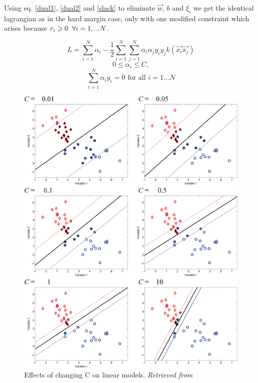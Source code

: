 \documentclass[final,3p,times,twocolumn]{elsarticle}
\begin{document}
Using eq. \ref{dual1}, \ref{dual2} and \ref{slack} to eliminate $\vec{w}$, $b$ and $\xi_{i}$ we get the identical lagrangian as in the hard margin case, only with one modified constraint which arises because $r_{i} \geqslant 0 \hspace{2mm} \forall i=1,...N$.

\begin{equation}
L = \sum_{i=1}^N\alpha_{i} - \frac{1}{2}\sum_{i=1}^N\sum_{j=1}^N\alpha_{i}\alpha_{j}y_{i}y_{j}k(\vec{x_{i}}\vec{x_{j}})
\end{equation}
\begin{equation*}
0 \leqslant \alpha_{i} \leqslant C, 
\end{equation*}
\begin{equation*}
\sum_{i=1}^N\alpha_{i}y_{i} = 0 \textrm{ for all }  i = 1...N
\end{equation*}

\begin{figure}
\includegraphics[scale=0.7]{Images/Changing_C.png} 
\caption{Effects of changing C on linear models. \textit{Retrieved from \cite{RBF2}}}
\label{changing_C}
\end{figure}
\end{document}

